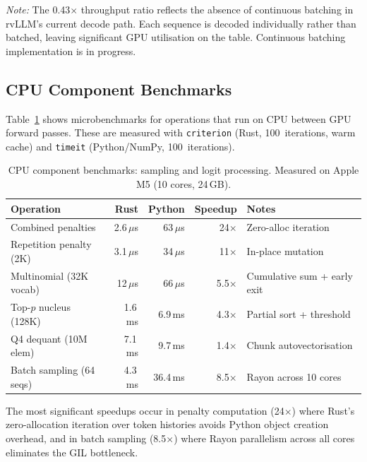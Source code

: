 \documentclass[11pt,a4paper]{article}
\newcommand{\thead}[1]{\textbf{\color{white}#1}}
\begin{document}
\smallskip\noindent\textit{Note:} The 0.43$\times$ throughput ratio reflects the
absence of continuous batching in rvLLM's current decode path. Each sequence is
decoded individually rather than batched, leaving significant GPU utilisation on the
table. Continuous batching implementation is in progress.

\subsection{CPU Component Benchmarks}

Table~\ref{tab:cpu_bench} shows microbenchmarks for operations that run on CPU between
GPU forward passes. These are measured with \texttt{criterion} (Rust, 100~iterations,
warm cache) and \texttt{timeit} (Python/NumPy, 100~iterations).

\begin{table}[t]
  \centering
  \caption{CPU component benchmarks: sampling and logit processing. Measured on Apple M5 (10 cores, 24\,GB).}
  \label{tab:cpu_bench}
  \small
  \begin{tabular}{@{}lrrrp{3.2cm}@{}}
    \toprule
    \rowcolor{HeaderBlue} \thead{Operation} & \thead{Rust} & \thead{Python} & \thead{Speedup} & \thead{Notes} \\
    \midrule
    Combined penalties      & 2.6\,$\mu$s  & 63\,$\mu$s  & 24$\times$  & Zero-alloc iteration \\
    \rowcolor{gray!8}
    Repetition penalty (2K) & 3.1\,$\mu$s  & 34\,$\mu$s  & 11$\times$  & In-place mutation \\
    Multinomial (32K vocab)  & 12\,$\mu$s   & 66\,$\mu$s  & 5.5$\times$ & Cumulative sum + early exit \\
    \rowcolor{gray!8}
    Top-$p$ nucleus (128K)  & 1.6\,ms      & 6.9\,ms     & 4.3$\times$ & Partial sort + threshold \\
    Q4 dequant (10M elem)   & 7.1\,ms      & 9.7\,ms     & 1.4$\times$ & Chunk autovectorisation \\
    \rowcolor{gray!8}
    Batch sampling (64 seqs) & 4.3\,ms     & 36.4\,ms    & 8.5$\times$ & Rayon across 10 cores \\
    \bottomrule
  \end{tabular}
\end{table}

The most significant speedups occur in penalty computation (24$\times$) where Rust's
zero-allocation iteration over token histories avoids Python object creation overhead,
and in batch sampling (8.5$\times$) where Rayon parallelism across all cores eliminates
the GIL bottleneck.
\end{document}
